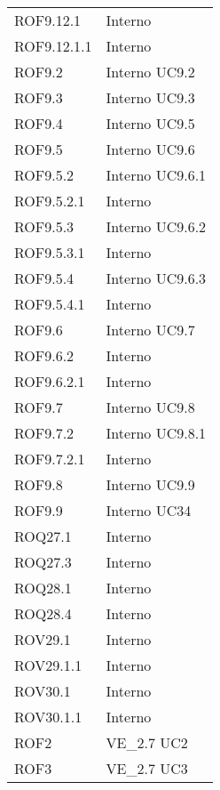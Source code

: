 \begin{longtable}{p{2.5cm}!{\VRule[1pt]}p{2.5cm}}
	\\
	ROF9.12.1 & Interno \\
	ROF9.12.1.1 & Interno \\
	ROF9.2 & Interno \newline UC9.2
	\\
	ROF9.3 & Interno \newline UC9.3
	\\
	ROF9.4 & Interno \newline UC9.5
	\\
	ROF9.5 & Interno \newline UC9.6
	\\
	ROF9.5.2 & Interno \newline UC9.6.1
	\\
	ROF9.5.2.1 & Interno \\
	ROF9.5.3 & Interno \newline UC9.6.2
	\\
	ROF9.5.3.1 & Interno \\
	ROF9.5.4 & Interno \newline UC9.6.3
	\\
	ROF9.5.4.1 & Interno \\
	ROF9.6 & Interno \newline UC9.7
	\\
	ROF9.6.2 & Interno \\
	ROF9.6.2.1 & Interno \\
	ROF9.7 & Interno \newline UC9.8
	\\
	ROF9.7.2 & Interno \newline UC9.8.1
	\\
	ROF9.7.2.1 & Interno \\
	ROF9.8 & Interno \newline UC9.9
	\\
	ROF9.9 & Interno \newline UC34
	\\
	ROQ27.1 & Interno \\
	ROQ27.3 & Interno \\
	ROQ28.1 & Interno \\
	ROQ28.4 & Interno \\
	ROV29.1 & Interno \\
	ROV29.1.1 & Interno \\
	ROV30.1 & Interno \\
	ROV30.1.1 & Interno \\
	ROF2 & VE_2.7 \newline UC2
	\\
	ROF3 & VE_2.7 \newline UC3

\end{longtable}
